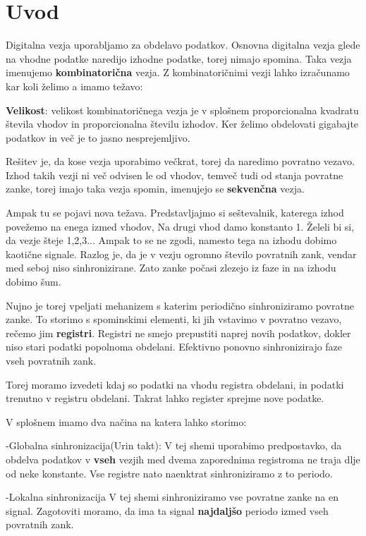 \chapter{Uvod} \label{uvod}

Digitalna vezja uporabljamo za obdelavo podatkov. Osnovna digitalna vezja glede na vhodne podatke naredijo izhodne podatke, torej nimajo spomina. Taka vezja imenujemo \textbf{kombinatorična} vezja.
Z kombinatoričnimi vezji lahko izračunamo kar koli želimo a imamo težavo:

\textbf{Velikost}: velikost kombinatoričnega vezja je v splošnem proporcionalna kvadratu števila vhodov in proporcionalna številu izhodov. Ker želimo obdelovati gigabajte podatkov in več je to jasno nesprejemljivo.

Rešitev je, da kose vezja uporabimo večkrat, torej da naredimo povratno vezavo. Izhod takih vezji ni več odvisen le od vhodov, temveč tudi od stanja povratne zanke, torej imajo taka vezja spomin, imenujejo se \textbf{sekvenčna} vezja.

Ampak tu se pojavi nova težava. Predstavljajmo si seštevalnik, katerega izhod povežemo na enega izmed vhodov, Na drugi vhod damo konstanto 1.
Želeli bi si, da vezje šteje 1,2,3... Ampak to se ne zgodi, namesto tega na izhodu dobimo kaotične signale. Razlog je, da je v vezju ogromno število povratnih zank, vendar med seboj niso sinhronizirane. Zato zanke počasi zlezejo iz faze in na izhodu dobimo šum.

Nujno je torej vpeljati mehanizem s katerim periodično sinhroniziramo povratne zanke. To storimo s spominskimi elementi, ki jih vstavimo v povratno vezavo, rečemo jim \textbf{registri}. Registri ne smejo prepustiti naprej novih podatkov, dokler niso stari podatki popolnoma obdelani. Efektivno ponovno sinhronizirajo faze vseh povratnih zank.

Torej moramo izvedeti kdaj so podatki na vhodu registra obdelani, in podatki trenutno v registru obdelani. Takrat lahko register sprejme nove podatke.

V splošnem imamo dva načina na katera lahko storimo:

-Globalna sinhronizacija(Urin takt):
	V tej shemi uporabimo predpostavko, da obdelva podatkov v \textbf{vseh} vezjih med dvema zaporednima registroma ne traja dlje od neke konstante. Vse registre nato naenktrat sinhroniziramo z to periodo.
	
-Lokalna sinhronizacija
	V tej shemi sinhroniziramo vse povratne zanke na en signal. Zagotoviti moramo, da ima ta signal \textbf{najdaljšo} periodo izmed vseh povratnih zank. 




	
